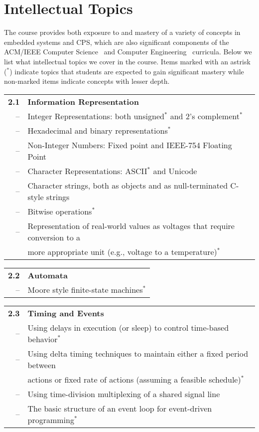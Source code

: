 \section{Intellectual Topics}
\label{sec:topics}

The course provides both exposure to and mastery of a variety of concepts
in embedded systems and CPS, which are also significant components
of the ACM/IEEE
Computer Science~\cite{cs13} and Computer Engineering~\cite{ce16} curricula.
Below we list what intellectual topics we cover in the course.
Items marked with an astrisk ($^*$)
indicate topics that students are expected to gain significant mastery
while non-marked items indicate concepts with lesser depth.

\vspace{0.1in}
\noindent
\begin{tabular}{r l}
{\bf 2.1} & {\bf Information Representation} \\
-- & Integer Representations: both unsigned$^*$ and 2's complement$^*$ \\
-- & Hexadecimal and binary representations$^*$ \\
-- & Non-Integer Numbers: Fixed point and IEEE-754 Floating Point \\
-- & Character Representations: ASCII$^*$ and Unicode \\
-- & Character strings, both as objects and as null-terminated C-style strings \\
-- &  Bitwise operations$^*$ \\
-- & Representation of real-world values as voltages that require conversion to a\\
\  & more appropriate unit (e.g., voltage to a temperature)$^*$
\end{tabular}

\vspace{0.1in}
\noindent
\begin{tabular}{r l}
{\bf 2.2} & {\bf Automata}\\
-- & Moore style finite-state machines$^*$
\end{tabular}

\vspace{0.1in}
\noindent
\begin{tabular}{r l}
{\bf 2.3} & {\bf Timing and Events} \\
-- & Using delays in execution (or sleep) to control time-based behavior$^*$ \\
-- & Using delta timing techniques to maintain either a fixed period between \\
\  & actions or fixed rate of actions (assuming a feasible schedule)$^*$ \\
-- & Using time-division multiplexing of a shared signal line \\
-- & The basic structure of an event loop for event-driven programming$^*$
\end{tabular}

